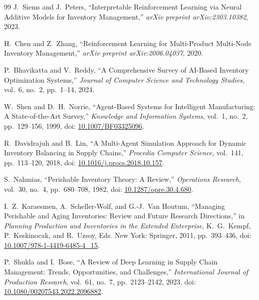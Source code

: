\documentclass[utf8]{FrontiersinHarvard}
\begin{document}
\begin{thebibliography}{99}
		J.~Siems and J.~Peters,
		``Interpretable Reinforcement Learning via Neural Additive Models for
		Inventory Management,''
		\emph{arXiv preprint arXiv:2303.10382}, 2023.

		H.~Chen and Z.~Zhang,
		``Reinforcement Learning for Multi-Product Multi-Node Inventory
		Management,''
		\emph{arXiv preprint arXiv:2006.04037}, 2020.

		P.~Bhavikatta and V.~Reddy,
		``A Comprehensive Survey of AI-Based Inventory Optimization Systems,''
		\emph{Journal of Computer Science and Technology Studies},
		vol.~6, no.~2, pp.~1--14, 2024.

		W.~Shen and D.~H.\ Norrie,
		``Agent-Based Systems for Intelligent Manufacturing: A State-of-the-Art
		Survey,''
		\emph{Knowledge and Information Systems},
		vol.~1, no.~2, pp.~129--156, 1999,
		doi: \href{https://doi.org/10.1007/BF03325096}{10.1007/BF03325096}.

		R.~Davidrajuh and B.~Lin,
		``A Multi-Agent Simulation Approach for Dynamic Inventory Balancing in
		Supply Chains,''
		\emph{Procedia Computer Science},
		vol.~141, pp.~113--120, 2018,
		doi: \href{https://doi.org/10.1016/j.procs.2018.10.157}{10.1016/j.procs.2018.10.157}.

		S.~Nahmias,
		``Perishable Inventory Theory: A Review,''
		\emph{Operations Research},
		vol.~30, no.~4, pp.~680--708, 1982,
		doi: \href{https://doi.org/10.1287/opre.30.4.680}{10.1287/opre.30.4.680}.

		I.~Z.\ Karaesmen, A.~Scheller-Wolf, and G.-J.\ Van Houtum,
		``Managing Perishable and Aging Inventories: Review and Future Research
		Directions,''
		in \emph{Planning Production and Inventories in the Extended Enterprise},
		K.~G.\ Kempf, P.~Keskinocak, and R.~Uzsoy, Eds.
		New York: Springer, 2011, pp.~393--436,
		doi: \href{https://doi.org/10.1007/978-1-4419-6485-4_15}{10.1007/978-1-4419-6485-4\_15}.

		P.~Shukla and I.~Bose,
		``A Review of Deep Learning in Supply Chain Management: Trends,
		Opportunities, and Challenges,''
		\emph{International Journal of Production Research},
		vol.~61, no.~7, pp.~2123--2142, 2023,
		doi: \href{https://doi.org/10.1080/00207543.2022.2096882}{10.1080/00207543.2022.2096882}.

	\end{thebibliography}
\end{document}
